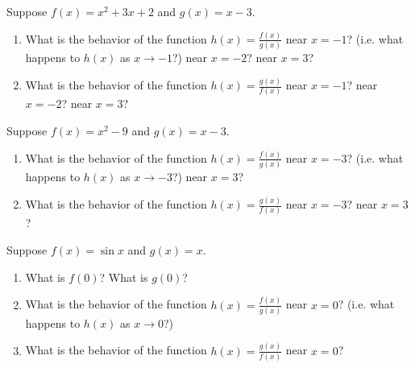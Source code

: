 \begin{activity}\label{A:0.6.3}

	
\ba
		\item Suppose $f(x) = x^{2}+ 3x + 2$ and $g(x) = x - 3$.  
			\begin{enumerate}
				\item What is the behavior of the function $h(x) = \displaystyle{\frac {f(x)}{g(x)}}$ near $x = -1$? (i.e. what happens to $h(x)$ as $x\to -1$?) near $x = -2$? near $x = 3$?
				\item What is the behavior of the function $h(x) = \displaystyle{\frac {g(x)}{f(x)}}$ near $x = -1$? near $x = -2$? near $x = 3$?
			\end{enumerate}
		\item Suppose $f(x) = x^{2} - 9$ and $g(x) = x - 3$.  
			\begin{enumerate}
				\item What is the behavior of the function $h(x) = \displaystyle{\frac {f(x)}{g(x)}}$ near $x = -3$? (i.e. what happens to $h(x)$ as $x\to -3$?) near $x = 3$?
				\item What is the behavior of the function $h(x) = \displaystyle{\frac {g(x)}{f(x)}}$ near $x = -3$? near $x = 3$?
			\end{enumerate}
		\item Suppose $f(x) = \sin{x}$ and $g(x) = x$.
			\begin{enumerate}
				\item What is $f(0)$? What is $g(0)$?
				\item What is the behavior of the function $h(x) = \displaystyle{\frac {f(x)}{g(x)}}$ near $x = 0$? (i.e. what happens to $h(x)$ as $x\to 0$?)
				\item What is the behavior of the function $h(x) = \displaystyle{\frac {g(x)}{f(x)}}$ near $x = 0$?
			\end{enumerate}
\ea

\end{activity}\aftera
